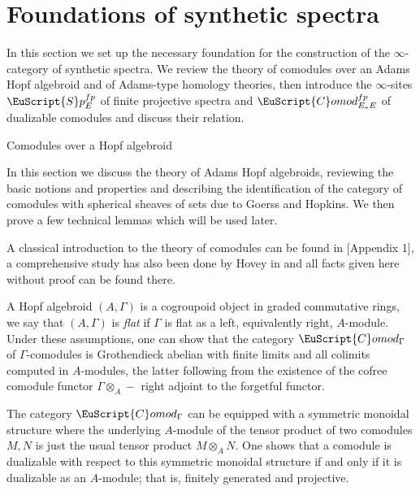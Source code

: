 \documentclass[oneside,a4paper]{amsart}
\makeatletter
\newcommand{\euscr}[1]{\EuScript{#1}} %
\newcommand{\spectra}{\euscr{S}p} %
\newcommand{\Comod}{\euscr{C}omod} %
\newcommand{\ComodE}{\Comod_{E_{*}E}} %
\newcommand{\ComodGamma}{\Comod_{\Gamma}} %
\theoremstyle{plain}
\theoremstyle{definition}
\theoremstyle{remark}
\def\subsection{\@startsection{subsection}{1}%
  \z@{.7\linespacing\@plus\linespacing}{.5\linespacing}%
  {\normalfont\bfseries\centering}}%
\makeatother
\begin{document}

\section{Foundations of synthetic spectra}
\label{section:foundations_of_synthetic_spectra}

In this section we set up the necessary foundation for the construction of the $\infty$-category of synthetic spectra. We review the theory of comodules over an Adams Hopf algebroid and of Adams-type homology theories, then introduce the $\infty$-sites $\spectra_{E}^{fp}$ of finite projective spectra and $\ComodE^{fp}$ of dualizable comodules and discuss their relation. 

\subsection{Comodules over a Hopf algebroid}

In this section we discuss the theory of Adams Hopf algebroids, reviewing the basic notions and properties and describing the identification of the category of comodules with spherical sheaves of sets due to Goerss and Hopkins. We then prove a few technical lemmas which will be used later. 

A classical introduction to the theory of comodules can be found in \cite{ravenel_complex_cobordism}[Appendix 1], a comprehensive study has also been done by Hovey  in \cite{hovey2003homotopy} and all facts given here without proof can be found there. 

A Hopf algebroid $(A, \Gamma)$ is a cogroupoid object in graded commutative rings, we say that $(A, \Gamma)$ is \emph{flat} if $\Gamma$ is flat as a left, equivalently right, $A$-module. Under these assumptions, one can show that the category $\ComodGamma$ of $\Gamma$-comodules is Grothendieck abelian with finite limits and all colimits computed in $A$-modules, the latter following from the existence of the cofree comodule functor $\Gamma \otimes_{A} -$ right adjoint to the forgetful functor.

The category $\ComodGamma$ can be equipped with a symmetric monoidal structure where the underlying $A$-module of the tensor product of two comodules $M, N$ is just the usual tensor product $M \otimes _{A} N$. One shows that a comodule is dualizable with respect to this symmetric monoidal structure if and only if it is dualizable as an $A$-module; that is, finitely generated and projective.
\end{document}

